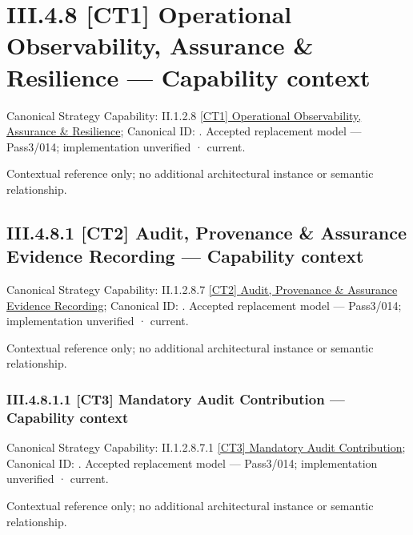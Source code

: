 \section*{III.4.8 [CT1] Operational Observability, Assurance \& Resilience — Capability context}
\label{navigation:III.4.8}

{\small Canonical Strategy Capability: II.1.2.8 \hyperref[element:209359b883df42379e7b1c44e65437d8]{[CT1] Operational Observability, Assurance \& Resilience}; Canonical ID: \texttt{}. Accepted replacement model — Pass3/014; implementation unverified · current.}\par
Contextual reference only; no additional architectural instance or semantic relationship.\par
\subsection*{III.4.8.1 [CT2] Audit, Provenance \& Assurance Evidence Recording — Capability context}
\label{navigation:III.4.8.1}

{\small Canonical Strategy Capability: II.1.2.8.7 \hyperref[element:adf5e2bc81b4468d9bb486b1d77bf92b]{[CT2] Audit, Provenance \& Assurance Evidence Recording}; Canonical ID: \texttt{}. Accepted replacement model — Pass3/014; implementation unverified · current.}\par
Contextual reference only; no additional architectural instance or semantic relationship.\par
\subsubsection*{III.4.8.1.1 [CT3] Mandatory Audit Contribution — Capability context}
\label{navigation:III.4.8.1.1}

{\small Canonical Strategy Capability: II.1.2.8.7.1 \hyperref[element:c9876be3523c4c82bb7cead743139ff4]{[CT3] Mandatory Audit Contribution}; Canonical ID: \texttt{}. Accepted replacement model — Pass3/014; implementation unverified · current.}\par
Contextual reference only; no additional architectural instance or semantic relationship.\par
